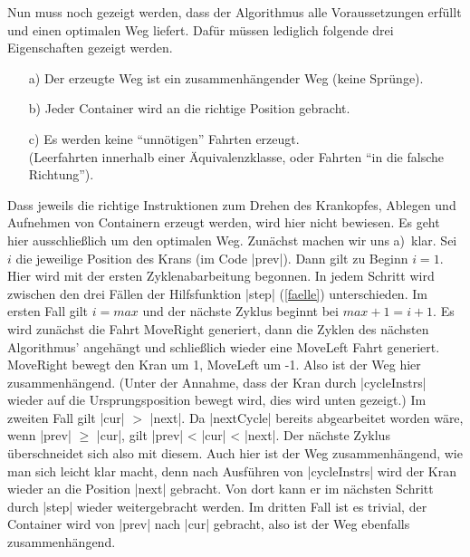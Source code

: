 Nun muss noch gezeigt werden, dass der Algorithmus alle Voraussetzungen erfüllt und einen optimalen Weg liefert.
Dafür müssen lediglich folgende drei Eigenschaften gezeigt werden.
\begin{enumerate}
 \item[a)] Der erzeugte Weg ist ein zusammenhängender Weg (keine Sprünge).
 \item[b)] Jeder Container wird an die richtige Position gebracht.
 \item[c)] Es werden keine ``unnötigen'' Fahrten erzeugt. \\
       (Leerfahrten innerhalb einer Äquivalenzklasse, oder Fahrten ``in die falsche Richtung'').
\end{enumerate}
Dass jeweils die richtige Instruktionen zum Drehen des Krankopfes, Ablegen und Aufnehmen von Containern erzeugt werden, wird hier nicht bewiesen.
Es geht hier ausschließlich um den optimalen Weg. Zunächst machen wir uns a)\ klar. Sei $i$ die jeweilige Position des Krans (im Code |prev|).
Dann gilt zu Beginn $i = 1$. Hier wird mit der ersten Zyklenabarbeitung begonnen. In jedem Schritt wird zwischen den drei Fällen der Hilfsfunktion |step| (\ref{faelle}) unterschieden.
Im ersten Fall gilt $i=max$ und der nächste Zyklus beginnt bei $max+1=i+1$.
Es wird zunächst die Fahrt MoveRight generiert, dann die Zyklen des nächsten Algorithmus' angehängt und schließlich wieder eine MoveLeft Fahrt generiert.
MoveRight bewegt den Kran um 1, MoveLeft um -1. Also ist der Weg hier zusammenhängend.
(Unter der Annahme, dass der Kran durch |cycleInstrs| wieder auf die Ursprungsposition bewegt wird, dies wird unten gezeigt.)
Im zweiten Fall gilt |cur| $>$ |next|. Da |nextCycle| bereits abgearbeitet worden wäre, wenn |prev| $\geq$ |cur|, gilt |prev| < |cur| < |next|.
Der nächste Zyklus überschneidet sich also mit diesem.
Auch hier ist der Weg zusammenhängend, wie man sich leicht klar macht, denn nach Ausführen von |cycleInstrs| wird der Kran wieder an die Position |next| gebracht.
Von dort kann er im nächsten Schritt durch |step| wieder weitergebracht werden.
Im dritten Fall ist es trivial, der Container wird von |prev| nach |cur| gebracht, also ist der Weg ebenfalls zusammenhängend.

